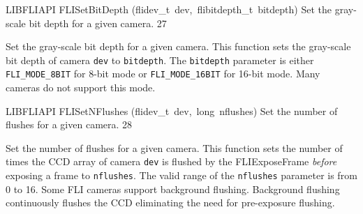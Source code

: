 \documentclass{article}
\begin{document}
\begin{cxxfunction}
{LIBFLIAPI}
        {FLISetBitDepth}
        {(flidev\_t\ dev,\ flibitdepth\_t\ bitdepth)}
        {
 Set the gray-scale bit depth for a given camera.}
        {27}
\begin{cxxdoc}

Set the gray-scale bit depth for a given camera.  This function
sets the gray-scale bit depth of camera \texttt{dev} to
\texttt{bitdepth}.  The \texttt{bitdepth} parameter is either
\texttt{FLI\_MODE\_8BIT} for 8-bit mode or \texttt{FLI\_MODE\_16BIT}
for 16-bit mode. Many cameras do not support this mode.


\end{cxxdoc}
\end{cxxfunction}
\begin{cxxfunction}
{LIBFLIAPI}
        {FLISetNFlushes}
        {(flidev\_t\ dev,\ long\ nflushes)}
        {
 Set the number of flushes for a given camera.}
        {28}
\begin{cxxdoc}

Set the number of flushes for a given camera.  This function sets
the number of times the CCD array of camera \texttt{dev} is flushed by
the FLIExposeFrame \emph{before} exposing a frame
to \texttt{nflushes}.  The valid range of the \texttt{nflushes}
parameter is from 0 to 16. Some FLI cameras support background flushing.
Background flushing continuously flushes the CCD eliminating the need for
pre-exposure flushing.


\end{cxxdoc}
\end{cxxfunction}
\end{document}
